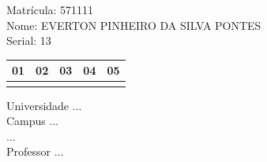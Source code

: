 \documentclass[10pt,a4paper,twocolumn]{report}
\begin{document}
Matrícula: 571111\\ Nome: EVERTON PINHEIRO DA SILVA PONTES \\ Serial: 13\\
\begin{tabular}{|l|l|l|l|l|}\hline
01  &02  &03  &04  &05 \\ \hline 
 & & & & \\ \hline 
\end{tabular}
 \cleardoublepage 

\begin{flushleft}
Universidade ...\\
Campus ...\\
...\\
Professor ...\\
\end{flushleft}
\end{document}
